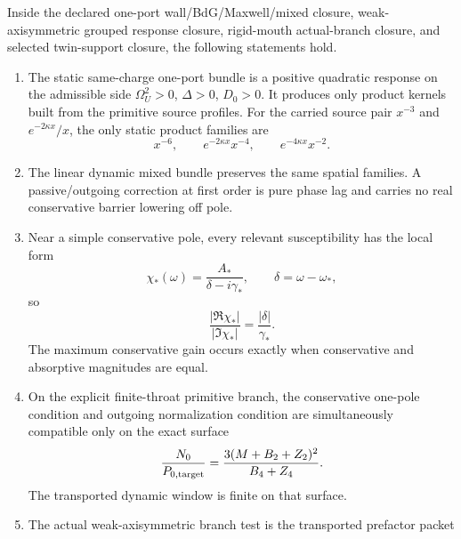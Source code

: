 \begin{theorem}
\label{thm:part07-main}
Inside the declared one-port wall/BdG/Maxwell/mixed closure, weak-axisymmetric grouped response closure, rigid-mouth actual-branch closure, and selected twin-support closure, the following statements hold.
\begin{enumerate}[leftmargin=2.2em]
  \item The static same-charge one-port bundle is a positive quadratic response on the admissible side \(\Omega_U^2>0\), \(\Delta>0\), \(D_0>0\).  It produces only product kernels built from the primitive source profiles.  For the carried source pair \(x^{-3}\) and \(e^{-2\kappa x}/x\), the only static product families are
  \begin{equation}
  \label{eq:part07-main-static-families}
  x^{-6},
  \qquad
  e^{-2\kappa x}x^{-4},
  \qquad
  e^{-4\kappa x}x^{-2}.
  \end{equation}
  \item The linear dynamic mixed bundle preserves the same spatial families.  A passive/outgoing correction at first order is pure phase lag and carries no real conservative barrier lowering off pole.
  \item Near a simple conservative pole, every relevant susceptibility has the local form
  \begin{equation}
  \label{eq:part07-main-line-shape}
  \chi_*(\omega)=\frac{A_*}{\delta-i\gamma_*},
  \qquad
  \delta=\omega-\omega_*,
  \end{equation}
  so
  \begin{equation}
  \label{eq:part07-main-line-ratio}
  \frac{|\Re\chi_*|}{|\Im\chi_*|}=\frac{|\delta|}{\gamma_*}.
  \end{equation}
  The maximum conservative gain occurs exactly when conservative and absorptive magnitudes are equal.
  \item On the explicit finite-throat primitive branch, the conservative one-pole condition and outgoing normalization condition are simultaneously compatible only on the exact surface
  \begin{equation}
  \label{eq:part07-main-compatibility-surface}
  \frac{N_0}{P_{0,{\rm target}}}
  =
  \frac{3(M+B_2+Z_2)^2}{B_4+Z_4}.
  \end{equation}
  The transported dynamic window is finite on that surface.
  \item The actual weak-axisymmetric branch test is the transported prefactor packet
  \begin{equation}

\end{equation}
\end{enumerate}
\end{theorem}
